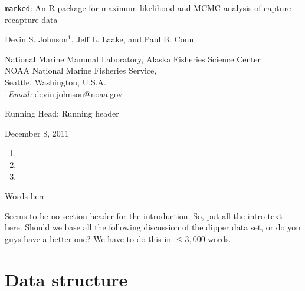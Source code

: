 \documentclass[12pt]{article}
\begin{document}
\renewcommand{\baselinestretch}{1.8}\normalsize

\begin{center}
{\LARGE {\tt marked}: An R package for maximum-likelihood and MCMC analysis of capture-recapture data}\vspace{0.5in}

{\large Devin S. Johnson$^1$, Jeff L. Laake, and Paul B. Conn}

\hrulefill

\renewcommand{\baselinestretch}{1.25}\large
National Marine Mammal Laboratory, Alaska Fisheries Science Center\\
NOAA National Marine Fisheries Service,\\
Seattle, Washington, U.S.A.\\
$^1${\em Email:} devin.johnson@noaa.gov

\hrulefill

\normalsize
{\sc Running Head}: Running header \bigskip

December 8, 2011
\end{center}


\clearpage





\begin{enumerate}
\item
\item
\item
\end{enumerate}

\noindent \hrulefill

 Words here

\clearpage

\linenumbers

\renewcommand{\baselinestretch}{1.8}\normalsize




Seems to be no section header for the introduction. So, put all the intro text here. Should we base all the following discussion of the dipper data set, or do you guys have a better one? We have to do this in $\le3,000$ words.

\section*{Data structure}
\end{document}
